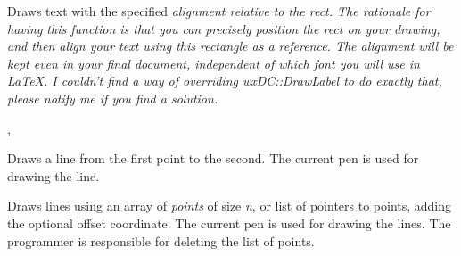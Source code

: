 \label{wxlatexdcdrawlabellatex}


Draws text with the specified \it alignment relative to the \it rect. The rationale for having this function is
that you can precisely position the \it rect on your drawing, and then align your text using this rectangle as
a reference. The alignment will be kept even in your final document, independent of which font you will use in
LaTeX.
I couldn't find a way of overriding wxDC::DrawLabel to do exactly that, please notify me if you find a solution.


, 

\label{wxlatexdcdrawline}


Draws a line from the first point to the second. The current pen is used
for drawing the line.

\label{wxlatexdcdrawlines}



Draws lines using an array of {\it points} of size {\it n}, or list of
pointers to points, adding the optional offset coordinate. The current
pen is used for drawing the lines.  The programmer is responsible for
deleting the list of points.

\label{wxlatexdcdrawpolygon}



